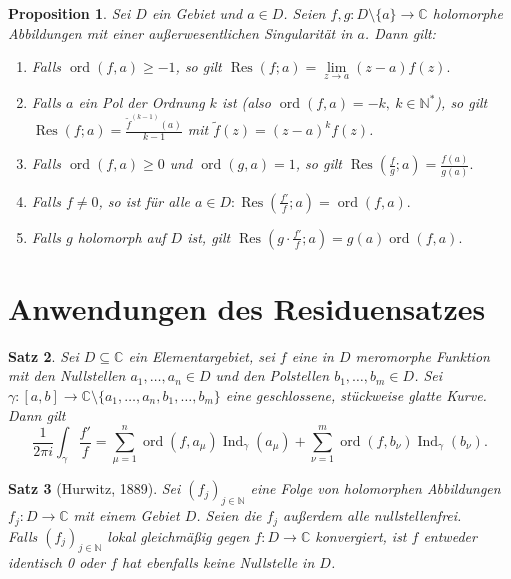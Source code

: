 \documentclass[a4paper,12pt]{book}
\theoremstyle{newthm}
\newtheorem{thm}{Satz}[section]
\newtheorem{prop}[thm]{Proposition}
\theoremstyle{newdef}
\theoremstyle{newrem}
\newcommand{\N}{\mathbb{N}}
\newcommand{\C}{\mathbb{C}}
\newcommand{\ord}[2]{\operatorname{ord} \left( #1,#2 \right)}
\newcommand{\Ind}[1]{\operatorname{Ind}_{#1}}
\newcommand{\Res}[2]{\operatorname{Res} \left( #1;#2 \right) }
\begin{document}
		\begin{prop}
			Sei $D$ ein Gebiet und $a \in D$. Seien $ f,g: D\setminus\{a\} \to \C $ holomorphe Abbildungen mit einer außerwesentlichen Singularität in $a$. Dann gilt:
			\begin{enumerate}[label={\alph*})]
				\item Falls $ \ord{f}{a} \geq -1 $, so gilt $ \Res{f}{a} = \lim\limits_{z \to a} (z-a)f(z). $
				\item Falls $a$ ein Pol der Ordnung $k$ ist (also $\ord{f}{a} = -k,\ k \in \N^*$), so gilt $ \Res{f}{a} = \frac{\tilde{f}^{(k-1)}(a)}{k-1} $ mit $\tilde{f}(z) = (z-a)^kf(z)$.
				\item Falls $\ord{f}{a} \geq 0$ und $\ord{g}{a} = 1$, so gilt $ \Res{\frac{f}{g}}{a} = \frac{f(a)}{g(a)}. $
				\item Falls $f \neq 0$, so ist für alle $a \in D: \Res{\frac{f'}{f}}{a} = \ord{f}{a}. $
				\item Falls $g$ holomorph auf $D$ ist, gilt $ \Res{g \cdot \frac{f'}{f}}{a} = g(a)\ord{f}{a}. $
			\end{enumerate}
		\end{prop}
	
	
	\section{Anwendungen des Residuensatzes} 
		
		\begin{thm}\label{3.5.1}
			Sei $D \subseteq \C$ ein Elementargebiet, sei $f$ eine in $D$ meromorphe Funktion mit den Nullstellen $ a_1,\dotsc,a_n \in D $ und den Polstellen $ b_1,\dotsc,b_m \in D $. Sei $ \gamma:[a,b] \to \C\setminus\{a_1,\dotsc,a_n,b_1,\dotsc,b_m\} $ eine geschlossene, stückweise glatte Kurve. Dann gilt 
			\[ \frac{1}{2\pi i} \int_\gamma \frac{f'}{f} = \sum_{\mu=1}^n \ord{f}{a_\mu} \Ind{\gamma}(a_\mu) + \sum_{\nu=1}^m \ord{f}{b_\nu} \Ind{\gamma}(b_\nu). \]
		\end{thm}
		
		\begin{thm}[Hurwitz, 1889]
			Sei $ (f_j)_{j \in \N} $ eine Folge von holomorphen Abbildungen $ f_j : D \to \C $ mit einem Gebiet $D$. Seien die $f_j$ außerdem alle nullstellenfrei.\\
			Falls $(f_j)_{j \in \N}$ lokal gleichmäßig gegen $f: D \to \C$ konvergiert, ist $f$ entweder identisch 0 oder $f$ hat ebenfalls keine Nullstelle in $D$.
		\end{thm}
		
\end{document}
